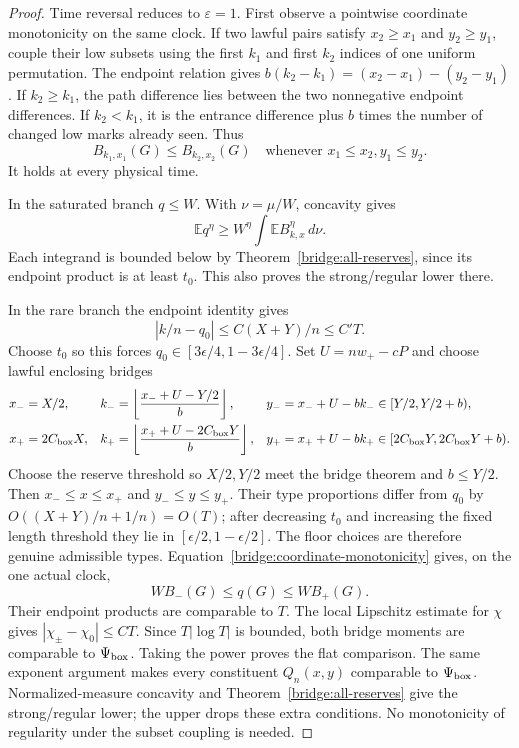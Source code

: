 \begin{proof}
Time reversal reduces to $\varepsilon=1$. First observe a pointwise
coordinate monotonicity on the same clock. If two lawful pairs satisfy
$x_2\ge x_1$ and $y_2\ge y_1$, couple their low subsets using the
first $k_1$ and first $k_2$ indices of one uniform permutation.
The endpoint relation gives
$b(k_2-k_1)=(x_2-x_1)-(y_2-y_1)$.
If $k_2\ge k_1$, the path difference lies between the two
nonnegative endpoint differences. If $k_2<k_1$, it is the entrance
difference plus $b$ times the number of changed low marks already
seen. Thus
\begin{equation}
 B_{k_1,x_1}(G)\le B_{k_2,x_2}(G)
 \quad\text{whenever }x_1\le x_2, y_1\le y_2.
 \label{bridge:coordinate-monotonicity}
\end{equation}
It holds at every physical time.

In the saturated branch $q\le W$. With $\nu=\mu/W$, concavity gives
\[
 \mathbb E q^\eta\ge W^\eta
          \int\mathbb E B_{k,x}^\eta\,d\nu.
\]
Each integrand is bounded below by Theorem~\ref{bridge:all-reserves},
since its endpoint product is at least $t_0$. This also proves the
strong/regular lower there.

In the rare branch the endpoint identity gives
\[
 |k/n-q_0|\le C(X+Y)/n\le C'T.
\]
Choose $t_0$ so this forces
$q_0\in[3\epsilon/4,1-3\epsilon/4]$. Set $U=nw_+-cP$ and choose
lawful enclosing bridges
\begin{align*}
 x_-&=X/2,&k_-&=\left\lfloor\frac{x_-+U-Y/2}{b}\right\rfloor,
 &y_-&=x_-+U-bk_-\in[Y/2,Y/2+b),\\
 x_+&=2C_{\rm box}X,&
 k_+&=\left\lfloor\frac{x_++U-2C_{\rm box}Y}{b}\right\rfloor,
 &y_+&=x_++U-bk_+\in[2C_{\rm box}Y,2C_{\rm box}Y+b).
\end{align*}
Choose the reserve threshold so $X/2,Y/2$ meet the bridge theorem
and $b\le Y/2$. Then $x_-\le x\le x_+$ and
$y_-\le y\le y_+$. Their type proportions differ from $q_0$ by
$O((X+Y)/n+1/n)=O(T)$; after decreasing $t_0$ and increasing the
fixed length threshold they lie in
$[\epsilon/2,1-\epsilon/2]$. The floor choices are therefore genuine
admissible types. Equation~\eqref{bridge:coordinate-monotonicity}
gives, on the one actual clock,
\[
 WB_-(G)\le q(G)\le WB_+(G).
\]
Their endpoint products are comparable to $T$. The local Lipschitz
estimate for $\chi$ gives $|\chi_\pm-\chi_0|\le CT$.
Since $T|\log T|$ is bounded, both bridge moments are comparable
to $\Psi_{\rm box}$. Taking the power proves the flat comparison.
The same exponent argument makes every constituent $Q_n(x,y)$
comparable to $\Psi_{\rm box}$. Normalized-measure concavity and
Theorem~\ref{bridge:all-reserves} give the strong/regular lower;
the upper drops these extra conditions. No monotonicity of regularity
under the subset coupling is needed.
\end{proof}

